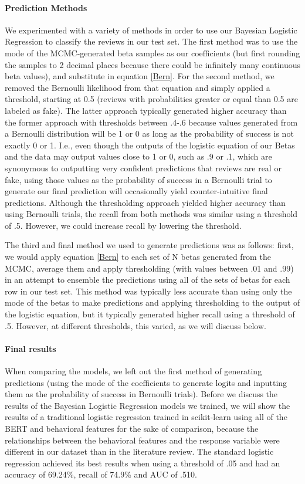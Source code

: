 \documentclass[man, floatsintext, 10pt]{apa6}
\begin{document}
\paragraph{Prediction Methods} We experimented with a variety of methods in order to use our Bayesian Logistic Regression to classify the reviews in our test set. The first method was to use the mode of the MCMC-generated beta samples as our coefficients (but first rounding the samples to 2 decimal places because there could be infinitely many continuous beta values), and substitute in equation \ref{Bern}. For the second method, we removed the Bernoulli likelihood from that equation and simply applied a threshold, starting at 0.5 (reviews with probabilities greater or equal than 0.5 are labeled as fake). The latter approach typically generated higher accuracy than the former approach with thresholds between .4-.6 because values generated from a Bernoulli distribution will be 1 or 0 as long as the probability of success is not exactly 0 or 1. I.e., even though the outputs of the logistic equation of our Betas and the data may output values close to 1 or 0, such as .9 or .1, which are synonymous to outputting very confident predictions that reviews are real or fake, using those values as the probability of success in a Bernoulli trial to generate our final prediction will occasionally yield counter-intuitive final predictions. Although the thresholding approach yielded higher accuracy than using Bernoulli trials, the recall from both methods was similar using a threshold of .5. However, we could increase recall by lowering the threshold. 

The third and final method we used to generate predictions was as follows: first, we would apply equation \ref{Bern} to each set of N betas generated from the MCMC, average them and apply thresholding (with values between .01 and .99) in an attempt to ensemble the predictions using all of the sets of betas for each row in our test set. This method was typically less accurate than using only the mode of the betas to make predictions and applying thresholding to the output of the logistic equation, but it typically generated higher recall using a threshold of .5. However, at different thresholds, this varied, as we will discuss below. 

\paragraph{Final results} When comparing the models, we left out the first method of generating predictions (using the mode of the coefficients to generate logits and inputting them as the probability of success in Bernoulli trials). Before we discuss the results of the Bayesian Logistic Regression models we trained, we will show the results of a traditional logistic regression trained in scikit-learn using all of the BERT and behavioral features for the sake of comparison, because the relationships between the behavioral features and the response variable were different in our dataset than in the literature review. The standard logistic regression achieved its best results when using a threshold of .05 and had an accuracy of 69.24\%, recall of 74.9\% and AUC of .510. 
\end{document}

